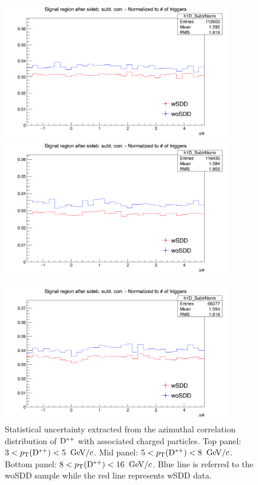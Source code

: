 \begin{figure}[!h]
\centering
\includegraphics[width=0.8\linewidth, height=6cm]{figures/wSDD_vs_woSDD/Uncertanty_AzimCorrDistr_Dstar_Canvas_PtIntBins2to3_PoolInt_thr0dot3to99dot0.png}
\includegraphics[width=0.8\linewidth, height=6cm]{figures/wSDD_vs_woSDD/Uncertanty_AzimCorrDistr_Dstar_Canvas_PtIntBins4to6_PoolInt_thr0dot3to99dot0.png}

\includegraphics[width=0.8\linewidth, height=6cm]{figures/wSDD_vs_woSDD/Uncertanty_AzimCorrDistr_Dstar_Canvas_PtIntBins7to9_PoolInt_thr0dot3to99dot0.png}
\caption{Statistical uncertainty extracted from the azimuthal correlation distribution of ${\rm D^{*+}}$ with associated charged particles. Top panel: $3 < p_{\rm T}({\rm D^{*+}}) < 5$ $\mathrm{GeV}/c$.
Mid panel: $5 < p_{\rm T}({\rm D^{*+}}) < 8$ $\mathrm{GeV}/c$. Bottom panel: $8 < p_{\rm T}({\rm D^{*+}}) < 16$ $\mathrm{GeV}/c$.
Blue line is referred to the woSDD sample while the red line represents wSDD data.}
\label{wSSvswoSDDuncertainty}
\end{figure}

